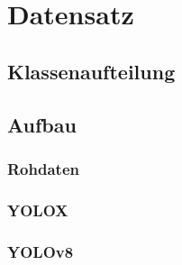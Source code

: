 \chapter{Datensatz}\label{chap:dataset}

\section{Klassenaufteilung}

\section{Aufbau}
\subsection{Rohdaten}



\subsection{YOLOX}




\subsection{YOLOv8}





